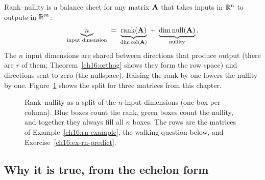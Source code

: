 \begin{intuitionbox}
Rank--nullity is a balance sheet for any matrix $\mathbf{A}$ that takes inputs in
$\mathbb{R}^n$ to outputs in $\mathbb{R}^m$:
\[
  \underbrace{n}_{\text{input dimension}} \;=\;
  \underbrace{\operatorname{rank}(\mathbf{A})}_{\operatorname{dim} \operatorname{col}(\mathbf{A})} \;+\;
  \underbrace{\operatorname{dim}\operatorname{null}(\mathbf{A})}_{\text{nullity}}.
\]
The $n$ input dimensions are shared between directions that produce output
(there are $r$ of them; Theorem~\ref{ch16:orthog} shows they form the row space)
and directions sent to zero (the nullspace). Raising the rank by one lowers the
nullity by one. Figure~\ref{ch16:rnbars} shows the split for three matrices from
this chapter.
\end{intuitionbox}

\begin{figure}[htbp]
\centering
{}
\caption{Rank--nullity as a split of the $n$ input dimensions (one box per
column). Blue boxes count the rank, green boxes count the nullity, and together
they always fill all $n$ boxes. The rows are the matrices of
Example~\protect\ref{ch16:rn-example}, the walking question below, and
Exercise~\protect\ref{ch16:ex-rn-predict}.}
\label{ch16:rnbars}
\end{figure}

\subsection{Why it is true, from the echelon form}

